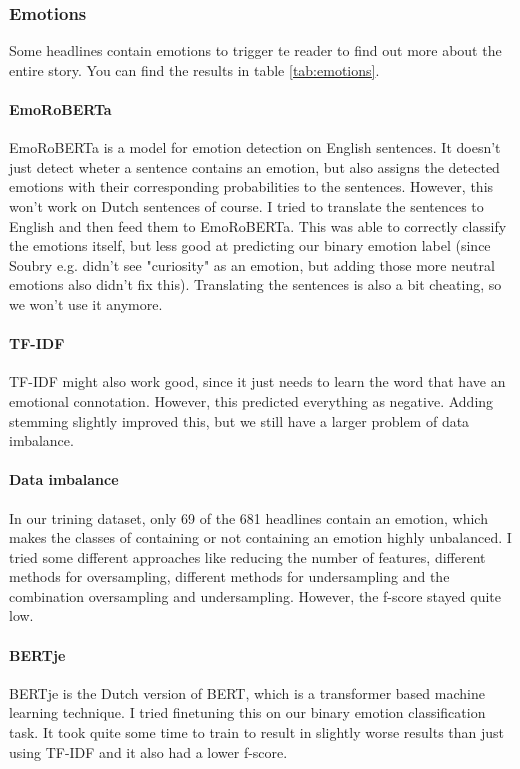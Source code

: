\documentclass{article}
\begin{document}
\subsubsection{Emotions}
Some headlines contain emotions to trigger te reader to find out more about the entire story. \cite{soubry} You can find the results in table \ref{tab:emotions}.

\paragraph{EmoRoBERTa} EmoRoBERTa is a model for emotion detection on English sentences. It doesn't just detect wheter a sentence contains an emotion, but also assigns the detected emotions with their corresponding probabilities to the sentences. However, this won't work on Dutch sentences of course. I tried to translate the sentences to English and then feed them to EmoRoBERTa. This was able to correctly classify the emotions itself, but less good at predicting our binary emotion label (since Soubry e.g. didn't see "curiosity" as an emotion, but adding those more neutral emotions also didn't fix this). Translating the sentences is also a bit cheating, so we won't use it anymore.

\paragraph{TF-IDF} TF-IDF might also work good, since it just needs to learn the word that have an emotional connotation. However, this predicted everything as negative. Adding stemming slightly improved this, but we still have a larger problem of data imbalance.

\paragraph{Data imbalance} In our trining dataset, only 69 of the 681 headlines contain an emotion, which makes the classes of containing or not containing an emotion highly unbalanced. I tried some different approaches like reducing the number of features, different methods for oversampling, different methods for undersampling and the combination oversampling and undersampling. However, the f-score stayed quite low.

\paragraph{BERTje} BERTje is the Dutch version of BERT, which is a transformer based machine learning technique. \cite{de2019bertje} I tried finetuning this on our binary emotion classification task. It took quite some time to train to result in slightly worse results than just using TF-IDF and it also had a lower f-score.
\end{document}
